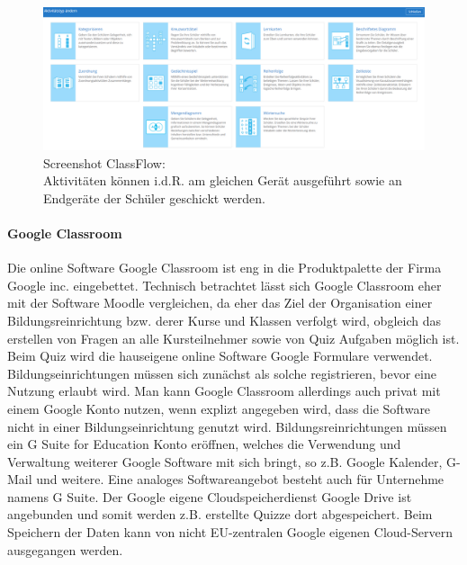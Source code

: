 \begin{figure}[H]
	\centering
	\includegraphics[width=0.8\linewidth]{bilder/screenshot_classflow}
	\caption[Screenshot ClassFlow]{Screenshot ClassFlow:\\ Aktivitäten können i.d.R. am gleichen Gerät ausgeführt sowie an Endgeräte der Schüler geschickt werden. \cite{PrometheanLimeted2019}}
	\label{fig:slso}
\end{figure}

\paragraph{Google Classroom}
Die online Software Google Classroom ist eng in die Produktpalette der Firma Google inc. eingebettet. Technisch betrachtet lässt sich Google Classroom eher mit der Software Moodle vergleichen, da eher das Ziel der Organisation einer Bildungsreinrichtung bzw. derer Kurse und Klassen verfolgt wird, obgleich das erstellen von Fragen an alle Kursteilnehmer sowie von Quiz Aufgaben möglich ist. Beim Quiz wird die hauseigene online Software Google Formulare verwendet. Bildungseinrichtungen müssen sich zunächst als solche registrieren, bevor eine Nutzung erlaubt wird. Man kann Google Classroom allerdings auch privat mit einem Google Konto nutzen, wenn explizt angegeben wird, dass die Software nicht in einer Bildungseinrichtung genutzt wird. Bildungsreinrichtungen müssen ein G Suite for Education Konto eröffnen, welches die Verwendung und Verwaltung weiterer Google Software mit sich bringt, so z.B. Google Kalender, G-Mail und weitere. Eine analoges Softwareangebot besteht auch für Unternehme namens G Suite. Der Google eigene Cloudspeicherdienst Google Drive ist angebunden und somit werden z.B. erstellte Quizze dort abgespeichert.  Beim Speichern der Daten kann von nicht EU-zentralen Google eigenen Cloud-Servern ausgegangen werden. 

